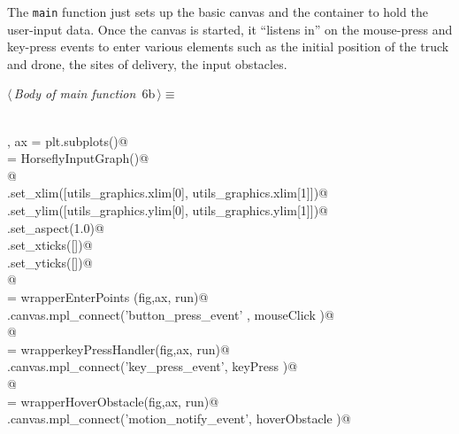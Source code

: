 \documentclass[11.5pt]{report}
\begin{document}
\begin{flushleft}
\begin{minipage}{\linewidth}
\begin{list}{}{\setlength{\itemsep}{-\parsep}\setlength{\itemindent}{-\leftmargin}}
\item{}
\end{list}
\end{minipage}\vspace{4ex}
\end{flushleft}


The \verb|main| function just sets up the basic canvas and the container to hold the user-input data. Once the canvas is started, it ``listens in'' on the mouse-press and key-press events 
to enter various elements such as the initial position of the truck and drone, the sites of delivery, the input obstacles. 

\begin{flushleft} \small\label{scrap5}\raggedright\small
{} $\langle\,${\itshape Body of main function}\nobreak\ {\footnotesize {6b}}$\,\rangle\equiv$
\vspace{-1ex}
\begin{list}{}{} \item
\mbox{}\verb@@\\
\mbox{}\verb@fig, ax =  plt.subplots()@\\
\mbox{}\verb@run = HorseflyInputGraph()@\\
\mbox{}\verb@        @\\
\mbox{}\verb@ax.set_xlim([utils_graphics.xlim[0], utils_graphics.xlim[1]])@\\
\mbox{}\verb@ax.set_ylim([utils_graphics.ylim[0], utils_graphics.ylim[1]])@\\
\mbox{}\verb@ax.set_aspect(1.0)@\\
\mbox{}\verb@ax.set_xticks([])@\\
\mbox{}\verb@ax.set_yticks([])@\\
\mbox{}\verb@          @\\
\mbox{}\verb@mouseClick = wrapperEnterPoints (fig,ax, run)@\\
\mbox{}\verb@fig.canvas.mpl_connect('button_press_event' , mouseClick )@\\
\mbox{}\verb@         @\\
\mbox{}\verb@keyPress   = wrapperkeyPressHandler(fig,ax, run)@\\
\mbox{}\verb@fig.canvas.mpl_connect('key_press_event', keyPress )@\\
\mbox{}\verb@    @\\
\mbox{}\verb@hoverObstacle  = wrapperHoverObstacle(fig,ax, run)@\\
\mbox{}\verb@fig.canvas.mpl_connect('motion_notify_event', hoverObstacle )@\\

\end{list}
\end{flushleft}
\end{document}
